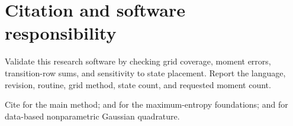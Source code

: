 \section{Citation and software responsibility}

Validate this research software by checking grid coverage, moment errors,
transition-row sums, and sensitivity to state placement. Report the language,
revision, routine, grid method, state count, and requested moment count.

Cite \textcite{FarmerToda2017QE} for the main method;
\textcite{TanakaToda2013EL} and \textcite{TanakaToda2015SINUM} for the
maximum-entropy foundations; and \textcite{Toda2021CE} for data-based
nonparametric Gaussian quadrature.

\footnotesize
\setlength{\bibitemsep}{0pt}
\printbibliography
\endgroup


